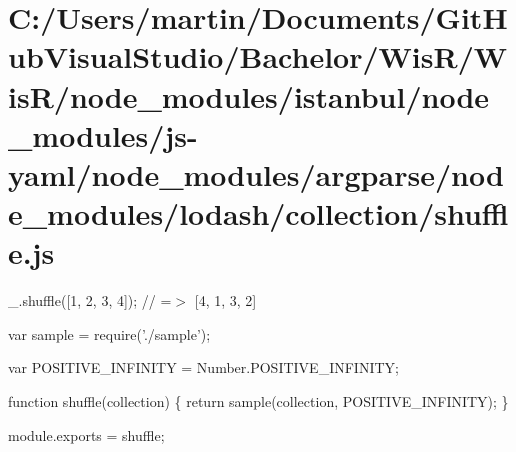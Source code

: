 \hypertarget{_c_1_2_users_2martin_2_documents_2_git_hub_visual_studio_2_bachelor_2_wis_r_2_wis_r_2node_module4fa44d4fc98206bd4a9b7861bf9716d5}{}\section{C\+:/\+Users/martin/\+Documents/\+Git\+Hub\+Visual\+Studio/\+Bachelor/\+Wis\+R/\+Wis\+R/node\+\_\+modules/istanbul/node\+\_\+modules/js-\/yaml/node\+\_\+modules/argparse/node\+\_\+modules/lodash/collection/shuffle.\+js}
\+\_\+.\+shuffle(\mbox{[}1, 2, 3, 4\mbox{]}); // =$>$ \mbox{[}4, 1, 3, 2\mbox{]}


\begin{DoxyCodeInclude}
var sample = require(\textcolor{stringliteral}{'./sample'});

var POSITIVE\_INFINITY = Number.POSITIVE\_INFINITY;

\textcolor{keyword}{function} shuffle(collection) \{
  \textcolor{keywordflow}{return} sample(collection, POSITIVE\_INFINITY);
\}

module.exports = shuffle;
\end{DoxyCodeInclude}
 